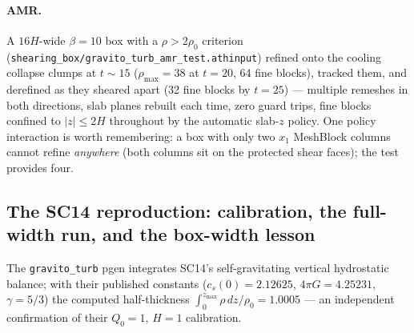 \documentclass[11pt]{article}
\newcommand{\code}[1]{\texttt{#1}}
\newcommand{\file}[1]{\texttt{#1}}
\begin{document}
\paragraph{AMR.} A $16H$-wide $\beta{=}10$ box with a $\rho > 2\rho_0$ criterion
(\file{shearing\_box/gravito\_turb\_amr\_test.athinput}) refined onto the cooling
collapse clumps at $t\sim15$ ($\rho_{\max} = 38$ at $t{=}20$, 64 fine blocks),
tracked them, and derefined as they sheared apart (32 fine blocks by $t{=}25$) ---
multiple remeshes in both directions, slab planes rebuilt each time, zero guard
trips, fine blocks confined to $|z| \le 2H$ throughout by the automatic slab-$z$
policy. One policy interaction is worth remembering: a box with only two $x_1$
MeshBlock columns cannot refine \emph{anywhere} (both columns sit on the protected
shear faces); the test provides four.

\subsection{The SC14 reproduction: calibration, the full-width run, and the
box-width lesson}

The \code{gravito\_turb} pgen integrates SC14's self-gravitating vertical
hydrostatic balance; with their published constants ($c_s(0) = 2.12625$,
$4\pi G = 4.25231$, $\gamma = 5/3$) the computed half-thickness
$\int_0^{z_{\max}}\!\rho\,dz/\rho_0 = 1.0005$ --- an independent confirmation of
their $Q_0 = 1$, $H = 1$ calibration.
\end{document}
